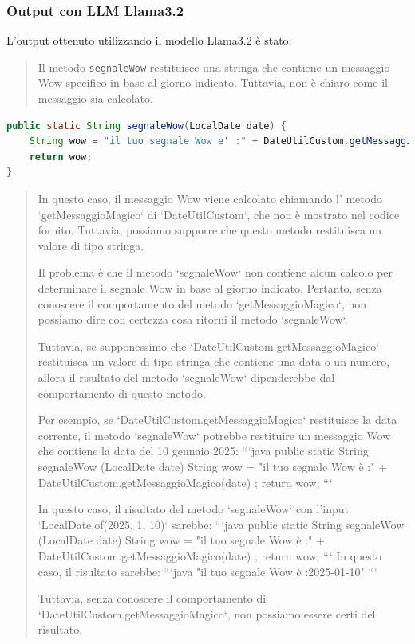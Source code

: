 \documentclass[12pt,a4paper,openright,twoside]{book}
\begin{document}
\subsubsection{Output con LLM Llama3.2}
L'output ottenuto utilizzando il modello Llama3.2 è stato:
\begin{quote}
Il metodo \texttt{segnaleWow} restituisce una stringa che contiene un messaggio Wow specifico in base al giorno indicato. Tuttavia, non è chiaro come il messaggio sia calcolato.
\end{quote}
\begin{lstlisting}[language=Java, caption={Implementazione del metodo segnaleWow}, label={lst:segnaleWow-impl}]
public static String segnaleWow(LocalDate date) {
    String wow = "il tuo segnale Wow e' :" + DateUtilCustom.getMessaggioMagico(date);
    return wow;
}
\end{lstlisting}
\begin{quote}
In questo caso, il messaggio Wow viene calcolato chiamando l' metodo `getMessaggioMagico` di `DateUtilCustom`, che non è mostrato nel codice fornito. Tuttavia, possiamo supporre che questo metodo restituisca un valore di tipo stringa.

Il problema è che il metodo `segnaleWow` non contiene alcun calcolo per determinare il segnale Wow in base al giorno indicato. Pertanto, senza conoscere il comportamento del 
metodo `getMessaggioMagico`, non possiamo dire con certezza cosa ritorni il metodo `segnaleWow`.

Tuttavia, se supponessimo che `DateUtilCustom.getMessaggioMagico` restituisca un valore di tipo stringa che contiene una data o un numero, allora il risultato del metodo `segnaleWow` dipenderebbe dal comportamento di questo metodo.

Per esempio, se `DateUtilCustom.getMessaggioMagico` restituisce la data corrente, il metodo `segnaleWow` potrebbe restituire un messaggio Wow che contiene la data del 10 gennaio 2025:
```java
public static String segnaleWow (LocalDate date){
    String wow = "il tuo segnale Wow è :" + DateUtilCustom.getMessaggioMagico(date) ;
    return wow;
}
```

In questo caso, il risultato del metodo `segnaleWow` con l'input `LocalDate.of(2025, 1, 10)` sarebbe:
```java
public static String segnaleWow (LocalDate date){
    String wow = "il tuo segnale Wow è :" + DateUtilCustom.getMessaggioMagico(date) ;
    return wow;
}
```
In questo caso, il risultato sarebbe:
```java
"il tuo segnale Wow è :2025-01-10"
```

Tuttavia, senza conoscere il comportamento di `DateUtilCustom.getMessaggioMagico`, non possiamo essere certi del risultato.
\end{quote}
\end{document}
